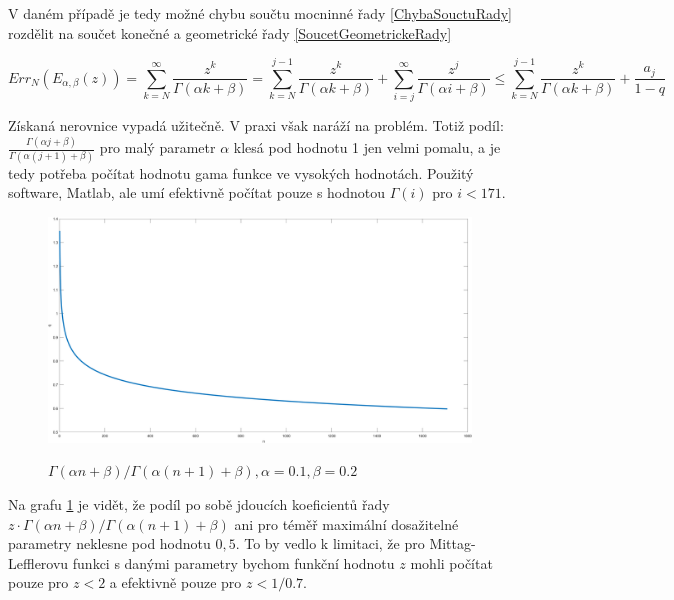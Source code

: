 \documentclass[a4paper,12pt,twoside]{article}
\theoremstyle{definition}
\theoremstyle{remark}
\numberwithin{equation}{section}
\numberwithin{table}{section}
\numberwithin{figure}{section}
\begin{document}
V daném případě je tedy možné chybu součtu mocninné řady \eqref{ChybaSouctuRady} rozdělit na součet konečné a geometrické řady \eqref{SoucetGeometrickeRady} 

$$	Err_{N} \left(E_{\alpha, \beta} \left( z\right)\right) = \sum_{k = N}^{\infty} \frac{z^{k}}{\Gamma\left( \alpha k + \beta \right)} = \sum_{k=N}^{j-1} \frac{z^{k}}{\Gamma\left( \alpha k + \beta \right)} +\sum_{i=j}^{\infty} \frac{z^{j}}{\Gamma\left( \alpha i + \beta \right)} \leq \sum_{k=N}^{j-1} \frac{z^{k}}{\Gamma\left( \alpha k + \beta \right)} + \frac{a_{j}}{1-q} $$

Získaná nerovnice vypadá užitečně. V praxi však naráží na problém.
Totiž podíl: $\frac{\Gamma \left(\alpha j + \beta\right)}{\Gamma \left(\alpha \left(j+1\right) + \beta\right)}$ pro malý parametr $\alpha$ klesá pod hodnotu 1 jen velmi pomalu, a je tedy potřeba počítat hodnotu gama funkce ve vysokých hodnotách. Použitý software, Matlab, ale umí efektivně počítat pouze s hodnotou $\Gamma(i)$ pro $i < 171$.

\begin{figure} %
	\caption{${\Gamma \left(\alpha n + \beta\right)}/{\Gamma \left(\alpha \left(n+1\right) + \beta\right)}, \alpha = 0.1, \beta = 0.2$}
	\includegraphics[width=1\textwidth]{fracGammaPlot.png}
	\label{fig:fracGammaPlot}
\end{figure}

Na grafu \ref{fig:fracGammaPlot} je vidět, že podíl po sobě jdoucích koeficientů řady $z \cdot {\Gamma \left(\alpha n + \beta\right)}/{\Gamma \left(\alpha \left(n+1\right) + \beta\right)}$ ani pro téměř maximální dosažitelné parametry neklesne pod hodnotu $0,5$. To by vedlo k limitaci, že pro Mittag-Lefflerovu funkci s danými parametry bychom funkční hodnotu $z$ mohli počítat pouze pro $z < 2$ a efektivně pouze pro $z < 1/0.7$.
\end{document}
